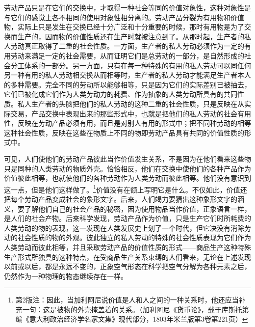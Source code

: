 \documentclass{ctexbook}
\begin{document}
    劳动产品只是在它们的交换中，才取得一种社会等同的价值对象性，这种对象性是与它们的感觉上各不相同的使用对象性相分离的。劳动产品分裂为有用物和价值物，实际上只是发生在交换已经十分广泛和十分重要的时候，那时有用物是为了交换而生产的，因而物的价值性质还在生产时就被注意到了。从那时起，生产者的私人劳动真正取得了二重的社会性质。一方面，生产者的私人劳动必须作为一定的有用劳动来满足一定的社会需要，从而证明它们是总劳动的一部分，是自然形成的社会分工体系的一部分。另一方面，只有在每一种特殊的有用的私人劳动可以同任何另一种有用的私人劳动相交换从而相等时，生产者的私人劳动才能满足生产者本人的多种需要。完全不同的劳动所以能够相等，只是因为它们的实际差别已被抽去，它们已被化成它们作为人类劳动力的耗费、作为抽象的人类劳动所具有的共同性质。私人生产者的头脑把他们的私人劳动的这种二重的社会性质，只是反映在从实际交易，产品交换中表现出来的那些形式中，也就是把他们的私人劳动的社会有用性，反映在劳动产品必须有用，而且是对别人有用的形式中；把不同种劳动的相等这种社会性质，反映在这些在物质上不同的物即劳动产品具有共同的价值性质的形式中。
    
    可见，人们使他们的劳动产品彼此当作价值发生关系，不是因为在他们看来这些物只是同种的人类劳动的物质外壳。恰恰相反，他们在交换中使他们的各种产品作为价值彼此相等，也就使他们的各种劳动作为人类劳动而彼此相等。他们没有意识到这一点，但是他们这样做了。\footnote{第2版注：因此，当加利阿尼说价值是人和人之间的一种关系时，他还应当补充一句：这是被物的外壳掩盖着的关系。（加利阿尼《货币论》，载于库斯托第编《意大利政治经济学名家文集》现代部分，1803年米兰版第3卷第221页）}价值没有在额上写明它是什么。不仅如此，价值还把每个劳动产品变成社会的象形文字。后来，人们竭力要猜出这种象形文字的涵义，要了解他们自己的社会产品的秘密，因为使用物品当作价值，正象语言一样，是人们的社会产物。后来科学发现，劳动产品作为价值，只是生产它们时所耗费的人类劳动的物的表现，这一发现在人类发展史上划了一个时代，但它决没有消除劳动的社会性质的物的外观。彼此独立的私人劳动的特殊的社会性质表现为它们作为人类劳动而彼此相等，并且采取劳动产品的价值性质的形式——商品生产这种特殊生产形式所独具的这种特点，在受商品生产关系束缚的人们看来，无论在上述发现以前或以后，都是永远不变的，正象空气形态在科学把空气分解为各种元素之后，仍然作为一种物理的物态继续存在一样。
    
\end{document}
